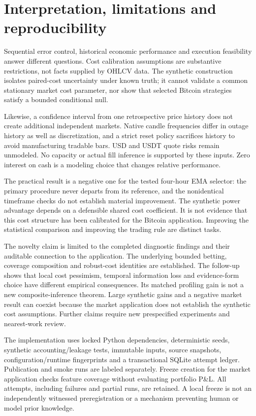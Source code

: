 \section{Interpretation, limitations and reproducibility}

Sequential error control, historical economic performance and execution
feasibility answer different questions. Cost calibration assumptions are
substantive restrictions, not facts supplied by OHLCV data. The synthetic
construction isolates paired-cost uncertainty under known truth; it cannot
validate a common stationary market cost parameter, nor show that selected
Bitcoin strategies satisfy a bounded conditional null.

Likewise, a confidence interval from one retrospective price history does not
create additional independent markets. Native candle frequencies differ in
outage history as well as discretization, and a strict reset policy sacrifices
history to avoid manufacturing tradable bars. USD and USDT quote risks remain
unmodeled. No capacity or actual fill inference is supported by these inputs.
Zero interest on cash is a modeling choice that changes relative performance.

The practical result is a negative one for the tested four-hour EMA selector: the primary
procedure never departs from its reference, and the nonidentical timeframe
checks do not establish material improvement. The synthetic power advantage
depends on a defensible shared cost coefficient. It is not evidence that this
cost structure has been calibrated for the Bitcoin application. Improving
the statistical comparison and improving the trading rule are distinct tasks.

The novelty claim is limited to the completed diagnostic findings and their
auditable connection to the application. The underlying bounded betting,
coverage composition and robust-cost identities are established. The follow-up
shows that local cost pessimism, temporal information loss and evidence-form
choice have different empirical consequences. Its matched profiling gain is
not a new composite-inference theorem. Large synthetic gains and a negative
market result can coexist because the market application does not establish
the synthetic cost assumptions. Further claims require new prespecified
experiments and nearest-work review.

The implementation uses locked Python dependencies, deterministic seeds,
synthetic accounting/leakage tests, immutable inputs, source snapshots,
configuration/runtime fingerprints and a transactional SQLite attempt ledger.
Publication and smoke runs are labeled separately. Freeze creation for the
market application checks feature coverage without evaluating portfolio P\&L.
All attempts, including failures and partial runs, are retained. A local freeze
is not an independently witnessed preregistration or a mechanism preventing
human or model prior knowledge.

